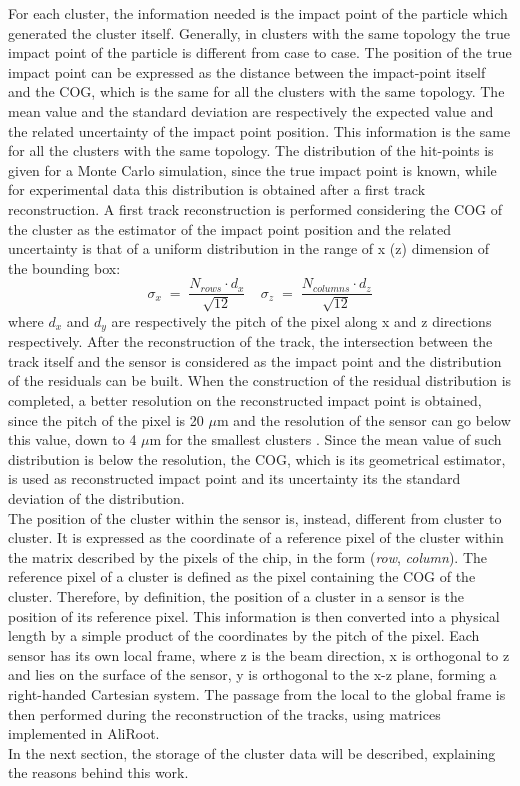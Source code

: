 For each cluster, the information needed is the impact point of the particle which generated the cluster itself. Generally, in clusters with the same topology the true impact point of the particle is different from case to case. The position of the true impact point can be expressed as the distance between the impact-point itself and the COG, which is the same for all the clusters with the same topology. The mean value and the standard deviation are respectively the expected value and the related uncertainty of the impact point position. This information is the same for all the clusters with the same topology. The distribution of the hit-points is given for a Monte Carlo simulation, since the true impact point is known, while for experimental data this distribution is obtained after a first track reconstruction. A first track reconstruction is performed considering the COG of the cluster as the estimator of the impact point position and the related uncertainty is that of a uniform distribution in the range of x (z) dimension of the bounding box:
\begin{equation} \label{eq:err}
 \sigma_x \; = \; \frac{N_{rows} \cdot d_x}{\sqrt{12}} \ \ \ \ \  \sigma_z \; = \; \frac{N_{columns} \cdot d_z}{\sqrt{12}}
\end{equation}
where $d_x$ and $d_y$ are respectively the pitch of the pixel along x and z directions respectively. After the reconstruction of the track, the intersection between the track itself and the sensor is considered as the impact point and the distribution of the residuals can be built. When the construction of the residual distribution is completed, a better resolution on the reconstructed impact point is obtained, since the pitch of the pixel is 20 $\mu$m and the resolution of the sensor can go below this value, down to 4 $\mu$m for the smallest clusters \cite{uptdr}. Since the mean value of such distribution is below the resolution, the COG, which is its geometrical estimator, is used as reconstructed impact point and its uncertainty its the standard deviation of the distribution.\\
The position of the cluster within the sensor is, instead, different from cluster to cluster. It is expressed as the coordinate of a reference pixel of the cluster within the matrix described by the pixels of the chip, in the form (\textit{row}, \textit{column}). The reference pixel of a cluster is defined as the pixel containing the COG of the cluster. Therefore, by definition, the position of a cluster in a sensor is the position of its reference pixel. This information is then converted into a physical length by a simple product of the coordinates by the pitch of the pixel. Each sensor has its own local frame, where z is the beam direction, x is orthogonal to z and lies on the surface of the sensor, y is orthogonal to the x-z plane, forming a right-handed Cartesian system. The passage from the local to the global frame is then performed during the reconstruction of the tracks, using matrices implemented in AliRoot.\\
In the next section, the storage of the cluster data will be described, explaining the reasons behind this work.
